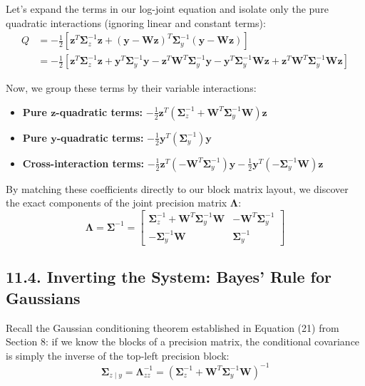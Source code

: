 \documentclass{article}
\begin{document}
Let's expand the terms in our log-joint equation and isolate only the pure quadratic interactions (ignoring linear and constant terms):
\begin{align*}
Q &= -\frac{1}{2} \left[ \mathbf{z}^T \boldsymbol{\Sigma}_z^{-1} \mathbf{z} + (\mathbf{y} - \mathbf{W}\mathbf{z})^T \boldsymbol{\Sigma}_y^{-1} (\mathbf{y} - \mathbf{W}\mathbf{z}) \right] \\
&= -\frac{1}{2} \left[ \mathbf{z}^T \boldsymbol{\Sigma}_z^{-1} \mathbf{z} + \mathbf{y}^T \boldsymbol{\Sigma}_y^{-1} \mathbf{y} - \mathbf{z}^T \mathbf{W}^T \boldsymbol{\Sigma}_y^{-1} \mathbf{y} - \mathbf{y}^T \boldsymbol{\Sigma}_y^{-1} \mathbf{W} \mathbf{z} + \mathbf{z}^T \mathbf{W}^T \boldsymbol{\Sigma}_y^{-1} \mathbf{W} \mathbf{z} \right]
\end{align*}

Now, we group these terms by their variable interactions:
\begin{itemize}
    \item \textbf{Pure $\mathbf{z}$-quadratic terms:} $-\frac{1}{2} \mathbf{z}^T \left( \boldsymbol{\Sigma}_z^{-1} + \mathbf{W}^T \boldsymbol{\Sigma}_y^{-1} \mathbf{W} \right) \mathbf{z}$
    \item \textbf{Pure $\mathbf{y}$-quadratic terms:} $-\frac{1}{2} \mathbf{y}^T \left( \boldsymbol{\Sigma}_y^{-1} \right) \mathbf{y}$
    \item \textbf{Cross-interaction terms:} $-\frac{1}{2} \mathbf{z}^T \left( -\mathbf{W}^T \boldsymbol{\Sigma}_y^{-1} \right) \mathbf{y} - \frac{1}{2} \mathbf{y}^T \left( -\boldsymbol{\Sigma}_y^{-1} \mathbf{W} \right) \mathbf{z}$
\end{itemize}

By matching these coefficients directly to our block matrix layout, we discover the exact components of the joint precision matrix $\boldsymbol{\Lambda}$:
\begin{equation}
\boldsymbol{\Lambda} = \boldsymbol{\Sigma}^{-1} = \begin{bmatrix} \boldsymbol{\Sigma}_z^{-1} + \mathbf{W}^T \boldsymbol{\Sigma}_y^{-1} \mathbf{W} & -\mathbf{W}^T \boldsymbol{\Sigma}_y^{-1} \\ -\boldsymbol{\Sigma}_y^{-1} \mathbf{W} & \boldsymbol{\Sigma}_y^{-1} \end{bmatrix} \tag{32}
\end{equation}

\subsection*{11.4. Inverting the System: Bayes' Rule for Gaussians}
Recall the Gaussian conditioning theorem established in Equation (21) from Section 8: if we know the blocks of a precision matrix, the conditional covariance is simply the inverse of the top-left precision block:
\begin{equation}
\boldsymbol{\Sigma}_{z \mid y} = \boldsymbol{\Lambda}_{zz}^{-1} = \left( \boldsymbol{\Sigma}_z^{-1} + \mathbf{W}^T \boldsymbol{\Sigma}_y^{-1} \mathbf{W} \right)^{-1} \tag{33}
\end{equation}
\end{document}
